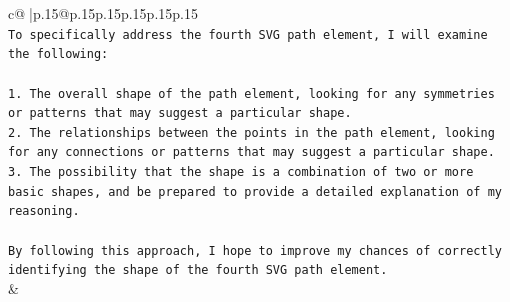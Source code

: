 \documentclass{article}
\begin{document}
{\begin{supertabular}{c@{$\;$}|p{.15\linewidth}@{}p{.15\linewidth}p{.15\linewidth}p{.15\linewidth}p{.15\linewidth}p{.15\linewidth}}
{{{\\ 
\texttt{To specifically address the fourth SVG path element, I will examine the following:} \\
\\ 
\texttt{1. The overall shape of the path element, looking for any symmetries or patterns that may suggest a particular shape.} \\
\texttt{2. The relationships between the points in the path element, looking for any connections or patterns that may suggest a particular shape.} \\
\texttt{3. The possibility that the shape is a combination of two or more basic shapes, and be prepared to provide a detailed explanation of my reasoning.} \\
\\ 
\texttt{By following this approach, I hope to improve my chances of correctly identifying the shape of the fourth SVG path element.} \\
            }
        }
    }
    & \\ \\

\end{supertabular}
}
\end{document}
